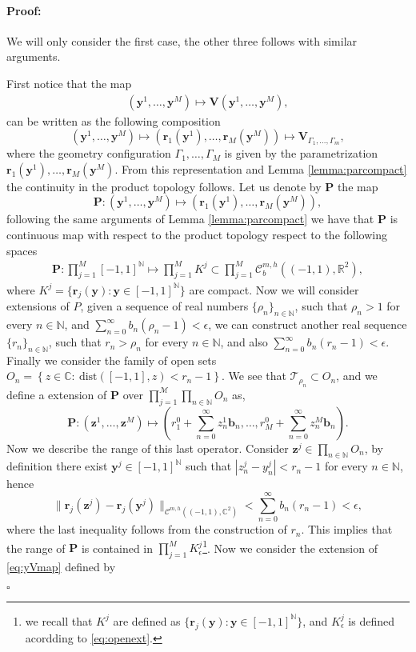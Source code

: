 \documentclass{article}
\newenvironment{proof}{\paragraph{Proof:}}{\hfill$\square$}
\newcommand{\M}{{\mathcal M}}
\newcommand{\IC}{{\mathbb C}}
\newcommand{\IN}{{\mathbb N}}
\newcommand{\IR}{{\mathbb R}}
\newcommand{\cmspaceh}[4]{\mathcal{C}^{#1,#2} \left( #3, #4 \right)}
\newcommand{\rgeoh}[2]{\mathcal{C}_b^{#1,#2}\left( (-1,1), \IR^2 \right)}
\newcommand{\bz}{\bm{z}}
\newcommand{\br}{\bm{r}}
\newcommand{\by}{\bm{y}}
\newcommand{\bb}{\bm{b}}
\begin{document}
\begin{proof}
We will only consider the first case, the other three follows with similar arguments.

First notice that the map 
\begin{align}
\label{eq:yVmap}
(\by^1,\hdots, \by^M) \mapsto \mathbf{V}(\by^1,\hdots, \by^M),
\end{align}
can be written as the following composition
$$
(\by^1,\hdots, \by^M) \mapsto  (\br_1(\by^1),\hdots,\br_M(\by^M))
\mapsto 
\mathbf{V}_{\Gamma_1,\hdots,\Gamma_m}, 
$$
where the geometry configuration $\Gamma_1,\hdots,\Gamma_M$ is given by the parametrization $\br_1(\by^1),\hdots,\br_M(\by^M)$. From this representation and Lemma \ref{lemma:parcompact} the continuity in the product topology follows. Let us denote by $\mathbf{P}$ the map 
$$
\mathbf{P} : (\by^1,\hdots, \by^M) \mapsto  (\br_1(\by^1),\hdots,\br_M(\by^M)),
$$
following the same arguments of Lemma \ref{lemma:parcompact} we have that $\mathbf{P}$ is continuous map with respect to the product topology respect to the following spaces 
\begin{align*}
\mathbf{P} : \prod_{j=1}^M [-1,1]^{\IN} 
\mapsto
\prod_{j=1}^M K^j \subset \prod_{j=1}^M \rgeoh{m}{h},
\end{align*}
where $K^j =\{ \br_j(\by): \by \in [-1,1]^{ \IN}\}$ are compact. Now we will consider extensions of $P$, given a sequence of real numbers $\{\rho_n\}_{n \in \IN}$, such that $\rho_n >1$ for every $n \in \IN$, and $\sum_{n=0}^\infty  b_n (\rho_n -1) < \epsilon$, we can construct another real sequence $\{r_n\}_{n \in \IN}$, such that $r_n > \rho_n$ for every $n\in \IN$, and also  $\sum_{n=0}^\infty  b_n (r_n -1) < \epsilon $. Finally we consider the family of open sets $O_n = \left\lbrace z \in \IC: \ \text{dist}([-1,1],z) < r_n-1\right\rbrace$. We see that $\mathcal{T}_{\rho_n} \subset O_n$, and we define a extension of $\mathbf{P}$ over $\prod_{j=1}^\M \prod_{n \in \IN} O_n$ as, 
$$
\mathbf{P} : (\bz^1,\hdots,\bz^M) \mapsto \left(r^0_1 + \sum_{n=0}^\infty z^1_n \bb_n , \hdots, r^0_M + \sum_{n=0}^\infty z^M_n \bb_n \right).
$$
Now we describe the range of this last operator. Consider $\bz^j \in \prod_{n \in \IN} O_n$, by definition there exist $\by^j \in [-1,1]^{\IN}$ such that $|z^j_n - y^j_n| < r_n-1$ for every $n \in \IN$, hence 
$$
\| \br_j(\bz^j) - \br_j(\by^j)\|_{\cmspaceh{m}{h}{(-1,1)}{\IC^2}} < \sum_{n=0}^\infty b_n (r_n -1) < \epsilon,
$$
where the last inequality follows from the construction of $r_n$. This implies that the range of $\mathbf{P}$ is contained in $\prod_{j=1}^M K^j_\epsilon$\footnote{we recall that $K^j$ are defined as $\{\br_j(\by): \by \in [-1,1]^\IN \}$, and $K^j_\epsilon$ is defined acordding to \eqref{eq:openext}.}. Now we consider the extension of \eqref{eq:yVmap} defined by 

\end{proof}
\end{document}
